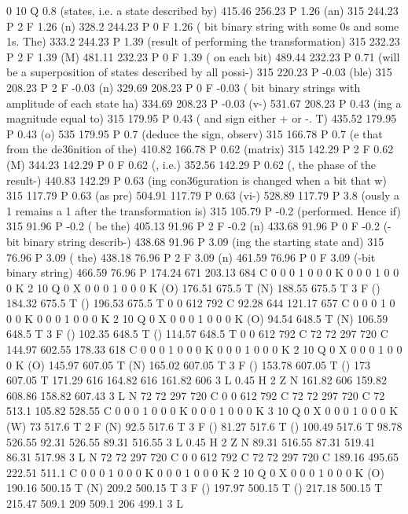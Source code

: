 0 10 Q
0.8 (states, i.e. a state described by) 415.46 256.23 P
1.26 (an) 315 244.23 P
2 F
1.26 (n) 328.2 244.23 P
0 F
1.26 ( bit binary string with some 0s and some 1s. The) 333.2 244.23 P
1.39 (result of performing the transformation) 315 232.23 P
2 F
1.39 (M) 481.11 232.23 P
0 F
1.39 ( on each bit) 489.44 232.23 P
0.71 (will be a superposition of states described by all possi-) 315 220.23 P
-0.03 (ble) 315 208.23 P
2 F
-0.03 (n) 329.69 208.23 P
0 F
-0.03 ( bit binary strings with amplitude of each state ha) 334.69 208.23 P
-0.03 (v-) 531.67 208.23 P
0.43 (ing a magnitude equal to) 315 179.95 P
0.43 ( and sign either + or -. T) 435.52 179.95 P
0.43 (o) 535 179.95 P
0.7 (deduce the sign, observ) 315 166.78 P
0.7 (e that from the de\336nition of the) 410.82 166.78 P
0.62 (matrix) 315 142.29 P
2 F
0.62 (M) 344.23 142.29 P
0 F
0.62 (, i.e.) 352.56 142.29 P
0.62 (, the phase of the result-) 440.83 142.29 P
0.63 (ing con\336guration is changed when a bit that w) 315 117.79 P
0.63 (as pre) 504.91 117.79 P
0.63 (vi-) 528.89 117.79 P
3.8 (ously a 1 remains a 1 after the transformation is) 315 105.79 P
-0.2 (performed. Hence if) 315 91.96 P
-0.2 ( be the) 405.13 91.96 P
2 F
-0.2 (n) 433.68 91.96 P
0 F
-0.2 (-bit binary string describ-) 438.68 91.96 P
3.09 (ing the starting state and) 315 76.96 P
3.09 ( the) 438.18 76.96 P
2 F
3.09 (n) 461.59 76.96 P
0 F
3.09 (-bit binary string) 466.59 76.96 P
174.24 671 203.13 684 C
0 0 0 1 0 0 0 K
0 0 0 1 0 0 0 K
2 10 Q
0 X
0 0 0 1 0 0 0 K
(O) 176.51 675.5 T
(N) 188.55 675.5 T
3 F
() 184.32 675.5 T
() 196.53 675.5 T
0 0 612 792 C
92.28 644 121.17 657 C
0 0 0 1 0 0 0 K
0 0 0 1 0 0 0 K
2 10 Q
0 X
0 0 0 1 0 0 0 K
(O) 94.54 648.5 T
(N) 106.59 648.5 T
3 F
() 102.35 648.5 T
() 114.57 648.5 T
0 0 612 792 C
72 72 297 720 C
144.97 602.55 178.33 618 C
0 0 0 1 0 0 0 K
0 0 0 1 0 0 0 K
2 10 Q
0 X
0 0 0 1 0 0 0 K
(O) 145.97 607.05 T
(N) 165.02 607.05 T
3 F
() 153.78 607.05 T
() 173 607.05 T
171.29 616 164.82 616 161.82 606 3 L
0.45 H
2 Z
N
161.82 606 159.82 608.86 158.82 607.43 3 L
N
72 72 297 720 C
0 0 612 792 C
72 72 297 720 C
72 513.1 105.82 528.55 C
0 0 0 1 0 0 0 K
0 0 0 1 0 0 0 K
3 10 Q
0 X
0 0 0 1 0 0 0 K
(W) 73 517.6 T
2 F
(N) 92.5 517.6 T
3 F
() 81.27 517.6 T
() 100.49 517.6 T
98.78 526.55 92.31 526.55 89.31 516.55 3 L
0.45 H
2 Z
N
89.31 516.55 87.31 519.41 86.31 517.98 3 L
N
72 72 297 720 C
0 0 612 792 C
72 72 297 720 C
189.16 495.65 222.51 511.1 C
0 0 0 1 0 0 0 K
0 0 0 1 0 0 0 K
2 10 Q
0 X
0 0 0 1 0 0 0 K
(O) 190.16 500.15 T
(N) 209.2 500.15 T
3 F
() 197.97 500.15 T
() 217.18 500.15 T
215.47 509.1 209 509.1 206 499.1 3 L
